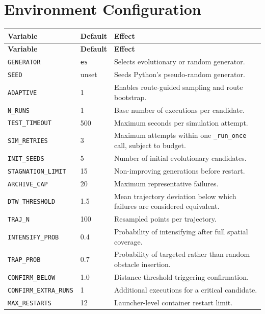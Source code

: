 \documentclass[11pt,a4paper,openany]{report}
\newcommand{\code}[1]{\texttt{#1}}
\begin{document}
\section{Environment Configuration}
\begin{longtable}{L{3.8cm} L{2.4cm} L{8.2cm}}
\toprule
\textbf{Variable} & \textbf{Default} & \textbf{Effect}\\
\midrule
\endfirsthead
\toprule
\textbf{Variable} & \textbf{Default} & \textbf{Effect}\\
\midrule
\endhead
\code{GENERATOR} & \code{es} & Selects evolutionary or random generator.\\
\code{SEED} & unset & Seeds Python's pseudo-random generator.\\
\code{ADAPTIVE} & 1 & Enables route-guided sampling and route bootstrap.\\
\code{N\_RUNS} & 1 & Base number of executions per candidate.\\
\code{TEST\_TIMEOUT} & 500 & Maximum seconds per simulation attempt.\\
\code{SIM\_RETRIES} & 3 & Maximum attempts within one \code{\_run\_once} call, subject to budget.\\
\code{INIT\_SEEDS} & 5 & Number of initial evolutionary candidates.\\
\code{STAGNATION\_LIMIT} & 15 & Non-improving generations before restart.\\
\code{ARCHIVE\_CAP} & 20 & Maximum representative failures.\\
\code{DTW\_THRESHOLD} & 1.5 & Mean trajectory deviation below which failures are considered equivalent.\\
\code{TRAJ\_N} & 100 & Resampled points per trajectory.\\
\code{INTENSIFY\_PROB} & 0.4 & Probability of intensifying after full spatial coverage.\\
\code{TRAP\_PROB} & 0.7 & Probability of targeted rather than random obstacle insertion.\\
\code{CONFIRM\_BELOW} & 1.0 & Distance threshold triggering confirmation.\\
\code{CONFIRM\_EXTRA\_RUNS} & 1 & Additional executions for a critical candidate.\\
\code{MAX\_RESTARTS} & 12 & Launcher-level container restart limit.\\
\bottomrule
\end{longtable}
\end{document}
